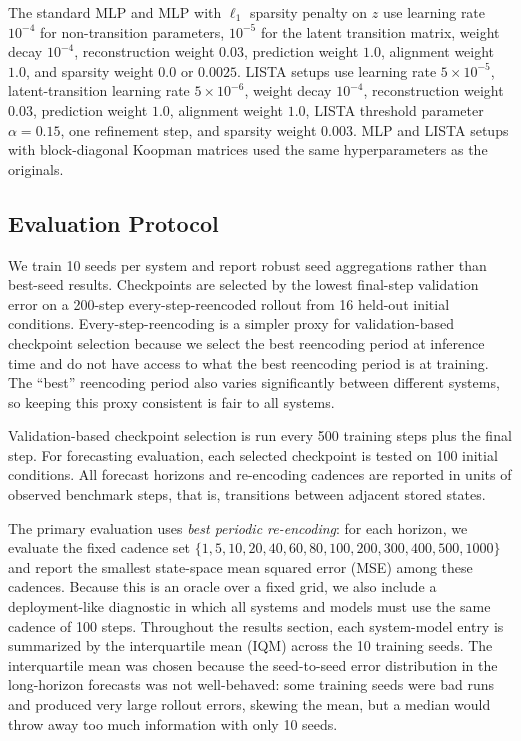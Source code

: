 The standard MLP and MLP with $\ell_1$ sparsity penalty on $z$ use learning rate $10^{-4}$ for non-transition parameters, $10^{-5}$ for the latent transition matrix, weight decay $10^{-4}$, reconstruction weight $0.03$, prediction weight $1.0$, alignment weight $1.0$, and sparsity weight $0.0$ or $0.0025$. 
LISTA setups use learning rate $5\times 10^{-5}$, latent-transition learning rate $5\times 10^{-6}$, weight decay $10^{-4}$, reconstruction weight $0.03$, prediction weight $1.0$, alignment weight $1.0$, LISTA threshold parameter $\alpha=0.15$, one refinement step, and sparsity weight $0.003$.
MLP and LISTA setups with block-diagonal Koopman matrices used the same hyperparameters as the originals.

\subsection{Evaluation Protocol}

We train 10 seeds per system and report robust seed aggregations rather than best-seed results. Checkpoints are selected by the lowest final-step validation error on a 200-step every-step-reencoded rollout from 16 held-out initial conditions. Every-step-reencoding is a simpler proxy for validation-based checkpoint selection because we select the best reencoding period at inference time and do not have access to what the best reencoding period is at training. The ``best'' reencoding period also varies significantly between different systems, so keeping this proxy consistent is fair to all systems.

Validation-based checkpoint selection is run every 500 training steps plus the final step.
For forecasting evaluation, each selected checkpoint is tested on 100 initial conditions. All forecast horizons and re-encoding cadences are reported in units of observed benchmark steps, that is, transitions between adjacent stored states.

The primary evaluation uses \emph{best periodic re-encoding}: for each horizon, we evaluate the fixed cadence set $\{1, 5, 10, 20, 40, 60, 80, 100, 200, 300, 400, 500, 1000\}$
and report the smallest state-space mean squared error (MSE) among these cadences.
Because this is an oracle over a fixed grid, we also include a deployment-like diagnostic in which all systems and models must use the same cadence of 100 steps. 
Throughout the results section, each system-model entry is summarized by the interquartile mean (IQM) across the 10 training seeds. 
The interquartile mean was chosen because the seed-to-seed error distribution in the long-horizon forecasts was not well-behaved: some training seeds were bad runs and produced very large rollout errors, skewing the mean, but a median would throw away too much information with only 10 seeds.

